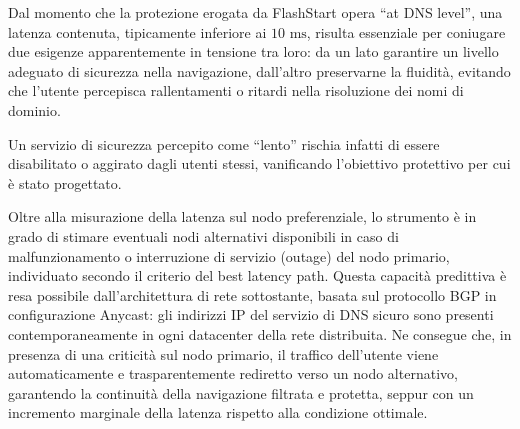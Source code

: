 Dal momento che la protezione erogata da FlashStart opera ``at \ac{DNS} level'', una latenza contenuta, tipicamente inferiore ai $10 \text{ ms}$, risulta essenziale per coniugare due esigenze apparentemente in tensione tra loro: da un lato garantire un livello adeguato di sicurezza nella navigazione, dall'altro preservarne la fluidità, evitando che l'utente percepisca rallentamenti o ritardi nella risoluzione dei nomi di dominio.

Un servizio di sicurezza percepito come ``lento'' rischia infatti di essere disabilitato o aggirato dagli utenti stessi, vanificando l'obiettivo protettivo per cui è stato progettato.

Oltre alla misurazione della latenza sul nodo preferenziale, lo strumento è in grado di stimare eventuali nodi alternativi disponibili in caso di malfunzionamento o interruzione di servizio (outage) del nodo primario, individuato secondo il criterio del best latency path. Questa capacità predittiva è resa possibile dall'architettura di rete sottostante, basata sul protocollo \ac{BGP} in configurazione Anycast: gli indirizzi \ac{IP} del servizio di \ac{DNS} sicuro sono presenti contemporaneamente in ogni datacenter della rete distribuita. Ne consegue che, in presenza di una criticità sul nodo primario, il traffico dell'utente viene automaticamente e trasparentemente rediretto verso un nodo alternativo, garantendo la continuità della navigazione filtrata e protetta, seppur con un incremento marginale della latenza rispetto alla condizione ottimale.


